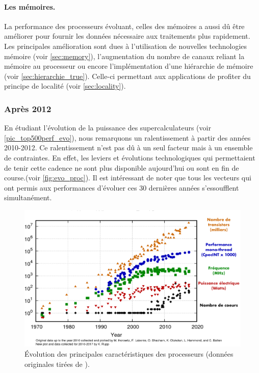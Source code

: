     
        \paragraph{Les mémoires.} La performance des processeurs évoluant, celles des mémoires a aussi dû être améliorer pour fournir les données nécessaire aux traitements plus rapidement. Les principales amélioration sont dues à l'utilisation de nouvelles technologies mémoire (voir \autoref{sec:memory}), l'augmentation du nombre de canaux reliant la mémoire au processeur ou encore l'implémentation d'une hiérarchie de mémoire (voir \autoref{sec:hierarchie_true}). Celle-ci permettant aux applications de profiter du principe de localité (voir \autoref{sec:locality}).
        
            
    
    \subsubsection{Après 2012}
    
        En étudiant l'évolution de la puissance des supercalculateurs (voir \autoref{pic_top500perf_evo}), nous remarquons un ralentissement à partir des années 2010-2012. Ce ralentissement n’est pas dû à un seul facteur mais à un ensemble de contraintes. En effet, les leviers et évolutions technologiques qui permettaient de tenir cette cadence ne sont plus disponible aujourd’hui ou sont en fin de course.(voir \autoref{fig:evo_proc}). Il est intéressant de noter que tous les vecteurs qui ont permis aux performances d'évoluer ces 30 dernières années s'essoufflent simultanément. 
       
        \begin{figure}
            \center
            \includegraphics[width=12cm]{images/evo_proc.png}
            \caption{\label{fig:evo_proc} Évolution des principales caractéristiques des processeurs (données originales tirées de \cite{rupp40years}\protect\footnotemark).}
        \end{figure}
        

